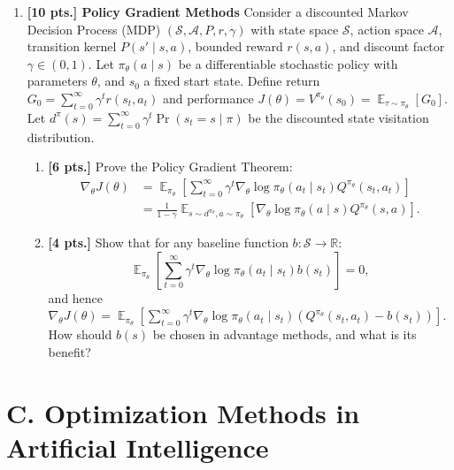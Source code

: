 \documentclass[11pt,a4paper]{article}
\DeclareMathOperator{\E}{\mathbb{E}}
\begin{document}
\begin{enumerate}[label=\textbf{\arabic*.}]
    \item \textbf{[10 pts.] Policy Gradient Methods}
    Consider a discounted Markov Decision Process (MDP) $(\mathcal{S}, \mathcal{A}, P, r, \gamma)$ with state space $\mathcal{S}$, action space $\mathcal{A}$, transition kernel $P(s' \mid s, a)$, bounded reward $r(s, a)$, and discount factor $\gamma \in (0, 1)$. Let $\pi_\theta(a \mid s)$ be a differentiable stochastic policy with parameters $\theta$, and $s_0$ a fixed start state. Define return $G_0 = \sum_{t=0}^\infty \gamma^t r(s_t, a_t)$ and performance $J(\theta) = V^{\pi_\theta}(s_0) = \E_{\tau \sim \pi_\theta}[G_0]$. Let $d^{\pi}(s) = \sum_{t=0}^\infty \gamma^t \Pr(s_t = s \mid \pi)$ be the discounted state visitation distribution.
    \begin{enumerate}[label=(\a*)]
        \item \textbf{[6 pts.]} Prove the Policy Gradient Theorem:
        \begin{align*}
        \nabla_\theta J(\theta) &= \E_{\pi_\theta} \left[ \sum_{t=0}^\infty \gamma^t \nabla_\theta \log \pi_\theta(a_t \mid s_t) Q^{\pi_\theta}(s_t, a_t) \right] \\
        &= \frac{1}{1 - \gamma} \E_{s \sim d^{\pi_\theta}, a \sim \pi_\theta} \left[ \nabla_\theta \log \pi_\theta(a \mid s) Q^{\pi_\theta}(s, a) \right].
        \end{align*}
        \item \textbf{[4 pts.]} Show that for any baseline function $b : \mathcal{S} \to \mathbb{R}$:
        \[
        \E_{\pi_\theta} \left[ \sum_{t=0}^\infty \gamma^t \nabla_\theta \log \pi_\theta(a_t \mid s_t) b(s_t) \right] = 0,
        \]
        and hence $\nabla_\theta J(\theta) = \E_{\pi_\theta} \left[ \sum_{t=0}^\infty \gamma^t \nabla_\theta \log \pi_\theta(a_t \mid s_t) (Q^{\pi_\theta}(s_t, a_t) - b(s_t)) \right]$. How should $b(s)$ be chosen in advantage methods, and what is its benefit?
    \end{enumerate}
\end{enumerate}

\section*{C. Optimization Methods in Artificial Intelligence}
\end{document}
